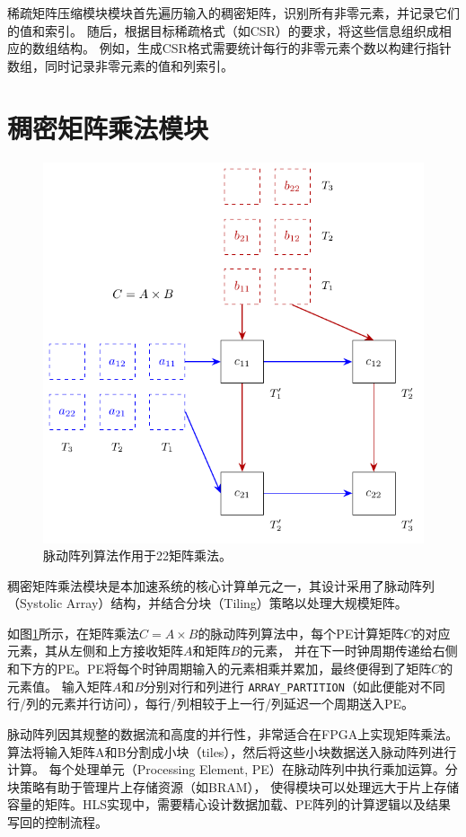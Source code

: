 稀疏矩阵压缩模块模块首先遍历输入的稠密矩阵，识别所有非零元素，并记录它们的值和索引。
随后，根据目标稀疏格式（如CSR）的要求，将这些信息组织成相应的数组结构。
例如，生成CSR格式需要统计每行的非零元素个数以构建行指针数组，同时记录非零元素的值和列索引。

\section{稠密矩阵乘法模块}

\begin{figure}[htbp]
\centerline{\includegraphics[width=0.8\columnwidth]{figures/systolic}}
\caption{脉动阵列算法作用于2\texttimes{}2矩阵乘法。}
\label{fig:systolic}
\end{figure}

稠密矩阵乘法模块是本加速系统的核心计算单元之一，其设计采用了脉动阵列（Systolic Array）结构，并结合分块（Tiling）策略以处理大规模矩阵。

如图\ref{fig:systolic}所示，在矩阵乘法\(C=A\times B\)的脉动阵列算法中，每个PE计算矩阵\(C\)的对应元素，其从左侧和上方接收矩阵\(A\)和矩阵\(B\)的元素，
并在下一时钟周期传递给右侧和下方的PE。PE将每个时钟周期输入的元素相乘并累加，最终便得到了矩阵\(C\)的元素值。
输入矩阵\(A\)和\(B\)分别对行和列进行 \verb|ARRAY_PARTITION|（如此便能对不同行/列的元素并行访问），每行/列相较于上一行/列延迟一个周期送入PE。

脉动阵列因其规整的数据流和高度的并行性，非常适合在FPGA上实现矩阵乘法。
算法将输入矩阵A和B分割成小块（tiles），然后将这些小块数据送入脉动阵列进行计算。
每个处理单元（Processing Element, PE）在脉动阵列中执行乘加运算。分块策略有助于管理片上存储资源（如BRAM），
使得模块可以处理远大于片上存储容量的矩阵。HLS实现中，需要精心设计数据加载、PE阵列的计算逻辑以及结果写回的控制流程。

